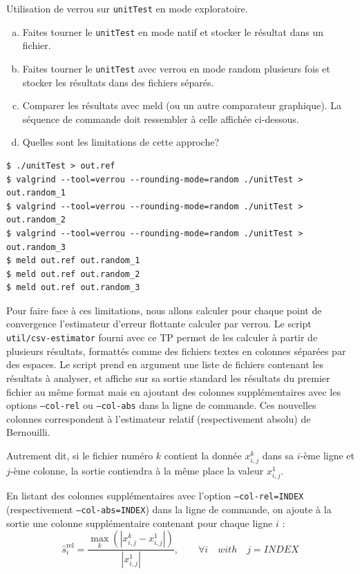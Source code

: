 \documentclass[a4paper]{article}
\newenvironment{commandline}{
  \begin{mdframed}[style=commandline]
}{
  \end{mdframed}
}
\newcounter{Question}
\newenvironment{question}[1][\unskip]{
  \bigskip
  \stepcounter{Question}
  \def\questionTitle{ #1}
  \begin{mdframed}[style=question]
  }{
  \end{mdframed}
}
\begin{document}
\begin{question}
  Utilisation de verrou sur \texttt{unitTest} en mode exploratoire.
  \begin{enumerate}[(a)]
  \item Faites tourner le \texttt{unitTest} en mode natif et stocker le résultat
    dans un fichier.
  \item Faites tourner le \texttt{unitTest} avec verrou en mode random plusieurs
    fois et stocker les résultats dans des fichiers séparés.
  \item Comparer les résultats avec meld (ou un autre comparateur
    graphique). La séquence de commande doit ressembler à celle
    affichée ci-dessous.
  \item Quelles sont les limitations de cette approche?
  \end{enumerate}
\end{question}

\begin{commandline}
\begin{verbatim}
$ ./unitTest > out.ref 
$ valgrind --tool=verrou --rounding-mode=random ./unitTest > out.random_1
$ valgrind --tool=verrou --rounding-mode=random ./unitTest > out.random_2
$ valgrind --tool=verrou --rounding-mode=random ./unitTest > out.random_3
$ meld out.ref out.random_1
$ meld out.ref out.random_2
$ meld out.ref out.random_3
\end{verbatim}
\end{commandline}


Pour faire face à ces limitations, nous allons calculer pour chaque
point de convergence l'estimateur d'erreur flottante calculer par verrou. 
Le script \texttt{util/csv-estimator} fourni avec ce TP permet de les
calculer à partir de plusieurs
résultats, formattés comme des fichiers textes en colonnes séparées par des
espaces. Le script prend en argument une liste de fichiers contenant les
résultats à analyser, et affiche sur sa sortie standard les résultats du premier fichier au même
format mais en ajoutant des colonnes supplémentaires avec les options \texttt{--col-rel} ou \texttt{--col-abs} dans la
ligne de commande. Ces nouvelles colonnes correspondent à l'estimateur relatif (respectivement absolu) de Bernouilli.

Autrement dit, si le fichier numéro $k$ contient la donnée $x_{i,j}^k$ dans sa
$i$-ème ligne et $j$-ème colonne, la sortie contiendra à la même place la valeur
$x_{i,j}^1$.

En listant des colonnes supplémentaires avec l'option
\texttt{--col-rel=INDEX} (respectivement \texttt{--col-abs=INDEX}) dans la
ligne de commande, on ajoute à la sortie une colonne supplémentaire
contenant pour chaque ligne $i$ :
\begin{equation*}
  \hat{s}^{\text{rel}}_{i} = \frac{\max_k ( \left|x_{i,j}^k
    -x_{i,j}^1\right|) }{\left| x_{i,j}^1 \right|}, \qquad \forall i
  \quad with \quad j=INDEX
\end{equation*}
\end{document}
